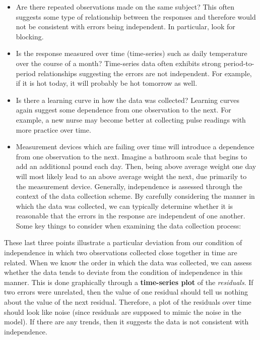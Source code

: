 \documentclass[
  letterpaper,
  DIV=11,
  numbers=noendperiod]{scrreprt}
\providecommand{\tightlist}{%
  \setlength{\itemsep}{0pt}\setlength{\parskip}{0pt}}\usepackage{longtable,booktabs,array}
\theoremstyle{definition}
\theoremstyle{definition}
\theoremstyle{plain}
\theoremstyle{remark}
\begin{document}
\begin{itemize}
\tightlist
\item
  Are there repeated observations made on the same subject? This often
  suggests some type of relationship between the responses and therefore
  would not be consistent with errors being independent. In particular,
  look for blocking.
\item
  Is the response measured over time (time-series) such as daily
  temperature over the course of a month? Time-series data often
  exhibits strong period-to-period relationships suggesting the errors
  are not independent. For example, if it is hot today, it will probably
  be hot tomorrow as well.
\item
  Is there a learning curve in how the data was collected? Learning
  curves again suggest some dependence from one observation to the next.
  For example, a new nurse may become better at collecting pulse
  readings with more practice over time.
\item
  Measurement devices which are failing over time will introduce a
  dependence from one observation to the next. Imagine a bathroom scale
  that begins to add an additional pound each day. Then, being above
  average weight one day will most likely lead to an above average
  weight the next, due primarily to the measurement device. Generally,
  independence is assessed through the context of the data collection
  scheme. By carefully considering the manner in which the data was
  collected, we can typically determine whether it is reasonable that
  the errors in the response are independent of one another. Some key
  things to consider when examining the data collection process:
\end{itemize}

These last three points illustrate a particular deviation from our
condition of independence in which two observations collected close
together in time are related. When we know the order in which the data
was collected, we can assess whether the data tends to deviate from the
condition of independence in this manner. This is done graphically
through a \textbf{time-series plot} of the \emph{residuals}. If two
errors were unrelated, then the value of one residual should tell us
nothing about the value of the next residual. Therefore, a plot of the
residuals over time should look like noise (since residuals are supposed
to mimic the noise in the model). If there are any trends, then it
suggests the data is not consistent with independence.
\end{document}
